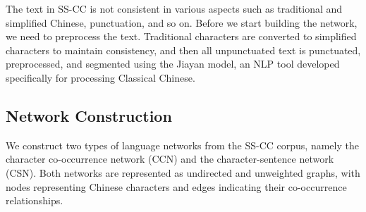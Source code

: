 \documentclass[11pt]{article}
\begin{document}
The text in SS-CC is not consistent in various aspects such as traditional and simplified Chinese, punctuation, and so on. Before we start building the network, we need to preprocess the text. Traditional characters are converted to simplified characters to maintain consistency, and then all unpunctuated text is punctuated, preprocessed, and segmented using the Jiayan model, an NLP tool developed specifically for processing Classical Chinese.

\subsection{Network Construction}
We construct two types of language networks from the SS-CC corpus, namely the character co-occurrence network (CCN) and the character-sentence network (CSN). Both networks are represented as undirected and unweighted graphs, with nodes representing Chinese characters and edges indicating their co-occurrence relationships.
\end{document}
